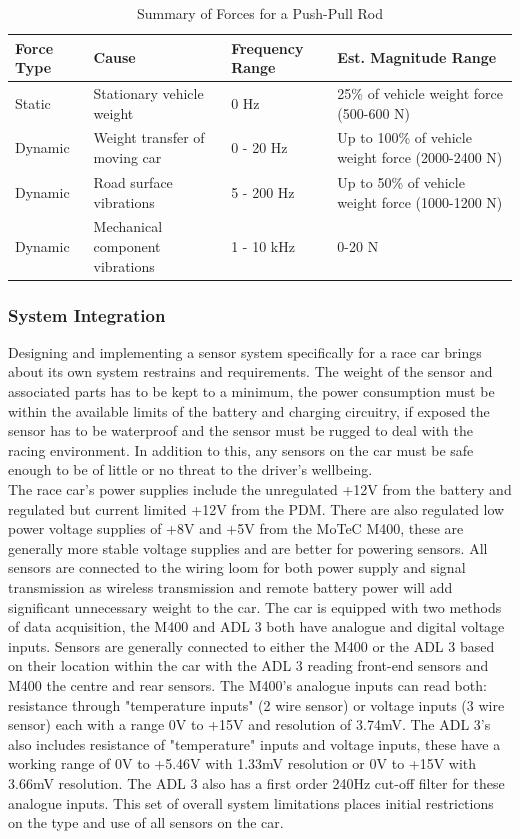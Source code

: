 \begin{table}[h]
	\caption{Summary of Forces for a Push-Pull Rod}
	\centering
	\renewcommand{\arraystretch}{1.5}
	\begin{tabular}{| l | m{4cm} | l | m{5cm} |}
		\hline
		\textbf{Force Type} & \textbf{Cause} & \textbf{Frequency Range} & \textbf{Est. Magnitude Range}\\ [0.5ex] 
		\hline \hline
		Static & Stationary vehicle weight & 0 Hz & 25\% of vehicle weight force (500-600 N)\\ [0.5ex] \hline
		Dynamic & Weight transfer of moving car & 0 - 20 Hz & Up to 100\% of vehicle weight force (2000-2400 N)\\ [0.5ex] \hline
		Dynamic & Road surface vibrations & 5 - 200 Hz & Up to 50\% of vehicle weight force (1000-1200 N)\\ [0.5ex] \hline
		Dynamic & Mechanical component vibrations & 1 - 10 kHz & 0-20 N\\ [0.5ex]
		\hline
	\end{tabular}
	\label{table:dynamicsus}
\end{table}

\subsubsection{System Integration}
Designing and implementing a sensor system specifically for a race car brings about its own system restrains and requirements. The weight of the sensor and associated parts has to be kept to a minimum, the power consumption must be within the available limits of the battery and charging circuitry, if exposed the sensor has to be waterproof and the sensor must be rugged  to deal with the racing environment. In addition to this, any sensors on the car must be safe enough to be of little or no threat to the driver's wellbeing.\\
The race car's power supplies include the unregulated +12V from the battery and regulated but current limited +12V from the PDM. There are also regulated low power voltage supplies of  +8V and +5V from the MoTeC M400, these are generally more stable voltage supplies and are better for powering sensors. All sensors are connected to the wiring loom for both power supply and signal transmission as wireless transmission and remote battery power will add significant unnecessary weight to the car. The car is equipped with two methods of data acquisition, the M400 and ADL 3 both have analogue and digital voltage inputs. Sensors are generally connected to either the M400 or the ADL 3 based on their location within the car with the ADL 3 reading front-end sensors and M400 the centre and rear sensors. The M400's analogue inputs can read both: resistance through "temperature inputs" (2 wire sensor) or voltage inputs (3 wire sensor) each with a range 0V to +15V and resolution of 3.74mV. The ADL 3's also includes resistance of "temperature" inputs and voltage inputs, these have a working range of 0V to +5.46V with 1.33mV resolution or 0V to +15V with 3.66mV resolution. The ADL 3 also has a first order 240Hz cut-off filter for these analogue inputs. This set of overall system limitations places initial restrictions on the type and use of all sensors on the car.\\

